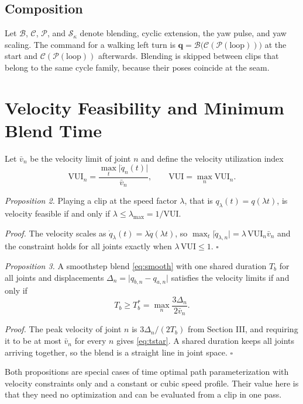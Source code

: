 \documentclass[10pt,journal]{IEEEtran}
\begin{document}
\subsection{Composition}
Let $\mathcal{B}$, $\mathcal{C}$, $\mathcal{P}$, and $\mathcal{S}_\kappa$ denote blending, cyclic extension, the yaw pulse, and yaw scaling. The command for a walking left turn is $\mathbf{q}=\mathcal{B}\bigl(\mathcal{C}(\mathcal{P}(\text{loop}))\bigr)$ at the start and $\mathcal{C}(\mathcal{P}(\text{loop}))$ afterwards. Blending is skipped between clips that belong to the same cycle family, because their poses coincide at the seam.

\section{Velocity Feasibility and Minimum Blend Time}
Let $\bar v_n$ be the velocity limit of joint $n$ and define the velocity utilization index
\begin{equation}
\mathrm{VUI}_n=\frac{\max_t\lvert\dot q_n(t)\rvert}{\bar v_n},\qquad \mathrm{VUI}=\max_n\mathrm{VUI}_n .
\label{eq:vui}
\end{equation}

\medskip
\noindent\textit{Proposition 2.} Playing a clip at the speed factor $\lambda$, that is $q_\lambda(t)=q(\lambda t)$, is velocity feasible if and only if $\lambda\le\lambda_{\max}=1/\mathrm{VUI}$.

\medskip
\noindent\textit{Proof.} The velocity scales as $\dot q_\lambda(t)=\lambda\dot q(\lambda t)$, so $\max_t\lvert\dot q_{\lambda,n}\rvert=\lambda\,\mathrm{VUI}_n\bar v_n$ and the constraint holds for all joints exactly when $\lambda\,\mathrm{VUI}\le1$. $\square$

\medskip
\noindent\textit{Proposition 3.} A smoothstep blend \eqref{eq:smooth} with one shared duration $T_b$ for all joints and displacements $\Delta_n=\lvert q_{b,n}-q_{a,n}\rvert$ satisfies the velocity limits if and only if
\begin{equation}
T_b\ge T_b^{*}=\max_n\frac{3\Delta_n}{2\bar v_n}.
\label{eq:tstar}
\end{equation}

\medskip
\noindent\textit{Proof.} The peak velocity of joint $n$ is $3\Delta_n/(2T_b)$ from Section III, and requiring it to be at most $\bar v_n$ for every $n$ gives \eqref{eq:tstar}. A shared duration keeps all joints arriving together, so the blend is a straight line in joint space. $\square$

Both propositions are special cases of time optimal path parameterization \cite{bobrow1985,pham2018} with velocity constraints only and a constant or cubic speed profile. Their value here is that they need no optimization and can be evaluated from a clip in one pass.
\end{document}
